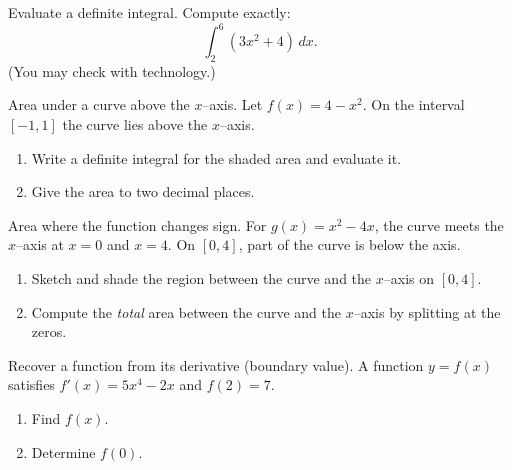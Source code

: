 \documentclass[11pt]{article}
\def\textbf#1{#1}%
\newcounter{question}
\begin{document}
\begin{question}
\textbf{Evaluate a definite integral.}
Compute exactly:
\[
\int_{2}^{6} (3x^{2}+4)\,dx.
\]
(You may check with technology.)
\end{question}

\begin{question}
\textbf{Area under a curve above the $x$–axis.}
Let $f(x)=4-x^{2}$. On the interval $[-1,1]$ the curve lies above the $x$–axis.
\begin{enumerate}
  \item Write a definite integral for the shaded area and evaluate it.
  \item Give the area to two decimal places.

\begin{center}
\end{center}
\end{enumerate}
\end{question}

\begin{question}
\textbf{Area where the function changes sign.}
For $g(x)=x^{2}-4x$, the curve meets the $x$–axis at $x=0$ and $x=4$. On $[0,4]$, part of the curve is below the axis.
\begin{enumerate}
  \item Sketch and shade the region between the curve and the $x$–axis on $[0,4]$.
  \item Compute the \emph{total} area between the curve and the $x$–axis by splitting at the zeros.
\end{enumerate}
\end{question}

\begin{question}
\textbf{Recover a function from its derivative (boundary value).}
A function $y=f(x)$ satisfies $f'(x)=5x^{4}-2x$ and $f(2)=7$.
\begin{enumerate}
  \item Find $f(x)$.
  \item Determine $f(0)$.
\end{enumerate}
\end{question}
\end{document}
